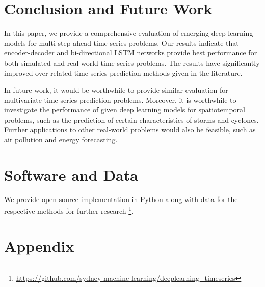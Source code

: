 \documentclass{ieeeaccess}
\begin{document}
  
 
 \section{Conclusion and Future Work}
 
 In this paper, we  provide a comprehensive evaluation of emerging deep learning models for multi-step-ahead time series problems. Our results indicate that encoder-decoder and bi-directional LSTM networks provide   best performance for both simulated and real-world time series problems. The results have significantly improved over related time series prediction methods given in the literature. 
 
 In future work, it would be worthwhile to provide similar evaluation for multivariate time series prediction problems. Moreover, it is worthwhile to investigate the performance of given deep learning models for spatiotemporal problems, such as the prediction of certain characteristics of storms and cyclones. Further applications to other real-world problems would also be feasible, such as air pollution and energy forecasting.  


 \section*{Software and Data}
We provide open source implementation in Python along with data for the respective methods  for further research \footnote{\url{https://github.com/sydney-machine-learning/deeplearning_timeseries}}.
 
 
\section*{Appendix}
\end{document}
